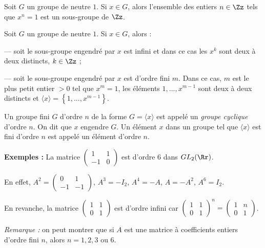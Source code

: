 \documentclass[class=report,crop=false]{standalone}
\newcommand{\GL}{GL}
\begin{document}
\begin{lemme}
Soit $G$ un groupe de neutre $1$. Si $x \in G$, alors l'ensemble des entiers $n \in \Zz$ tels que $x^n =1$ est un sous-groupe de $\Zz$.
\end{lemme}

\begin{proposition}
Soit $G$ un groupe de neutre $1$. Si $x \in G$, alors :

--- soit le sous-groupe engendré par $x$ est infini et dans ce cas les $x^k$ sont deux à deux distincts, $k\in \Zz$ ;

--- soit le sous-groupe engendré par $x$ est d'ordre fini $m$. Dans ce cas, $m$ est le plus petit entier $>0$ tel que $x^m =1$, les éléments $1,...,x^{m-1}$ sont deux à deux distincts et $\langle x \rangle = \left\{1,...,x^{m-1}\right\}$.


\end{proposition}

\begin{definition}
Un groupe fini $G$ d'ordre $n$ de la forme $G=\langle x \rangle$ est appelé un {\it groupe cyclique} d'ordre $n$. On dit que $x$ engendre $G$. Un élément $x$ dans un groupe tel que $\langle x\rangle $ est fini d'ordre $n$ est appelé un élément d'ordre $n$.
\end{definition}

{\bf Exemples : } La matrice $\left(\begin{array}{cc}
1&1\\
-1& 0
\end{array}\right)$ est d'ordre $6$ dans $\GL_2(\Rr)$. 

En effet, $A^2= \left(\begin{array}{cc}
0&1\\
-1& -1
\end{array}\right)$, $A^3 = -I_2$, $A^4 = -A$, $A=-A^2$, $A^6 =I_2$.


En revanche, la matrice $
\left(\begin{array}{cc}
1&1\\
 0&1
\end{array}\right)$ est d'ordre infini car $\left(\begin{array}{cc}
1&1\\
 0&1
\end{array}\right)^n = \left(\begin{array}{cc}
1&n\\
 0&1
\end{array}\right)$.

{\it Remarque :} on peut montrer que si $A$ est une matrice à coefficients entiers d'ordre fini $n$, alors $n =1,2,3$ ou $6$.
\end{document}
